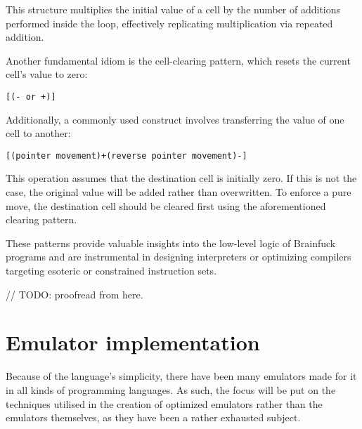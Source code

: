\par This structure multiplies the initial value of a cell by the number of additions performed inside the loop, effectively replicating multiplication via repeated addition.

\par Another fundamental idiom is the cell-clearing pattern, which resets the current cell's value to zero:

\begin{verbatim}
[(- or +)]
\end{verbatim}

\par Additionally, a commonly used construct involves transferring the value of one cell to another:

\begin{verbatim}
[(pointer movement)+(reverse pointer movement)-]
\end{verbatim}

\par This operation assumes that the destination cell is initially zero. If this is not the case, the original value will be added rather than overwritten. To enforce a pure move, the destination cell should be cleared first using the aforementioned clearing pattern.

\par These patterns provide valuable insights into the low-level logic of Brainfuck programs and are instrumental in designing interpreters or optimizing compilers targeting esoteric or constrained instruction sets.

\clearpage

// TODO: proofread from here.

\section{Emulator implementation}
\label{sec:ch2sec2}

\par Because of the language's simplicity, there have been many emulators made for it in all kinds of programming languages. As such, the focus will be put on the techniques utilised in the creation of optimized emulators rather than the emulators themselves, as they have been a rather exhausted subject.

